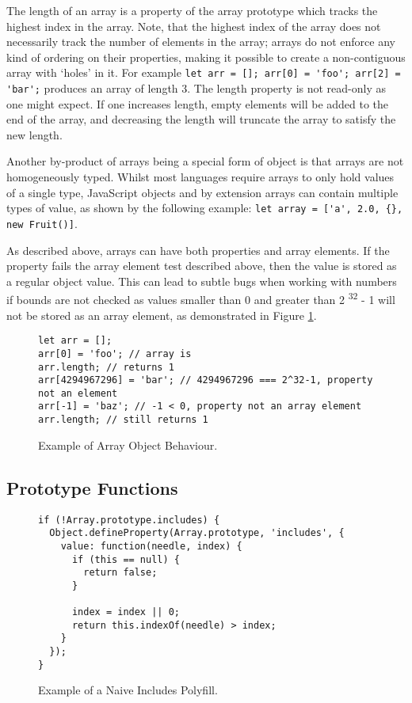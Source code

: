 \documentclass[]{final_report}
\begin{document}
The length of an array is a property of the array prototype which tracks the highest index in the array. Note, that the highest index of the array does not necessarily track the number of elements in the array; arrays do not enforce any kind of ordering on their properties, making it possible to create a non-contiguous array with `holes' in it. For example \lstinline|let arr = []; arr[0] = 'foo'; arr[2] = 'bar';| produces an array of length 3. The length property is not read-only as one might expect. If one increases length, empty elements will be added to the end of the array, and decreasing the length will truncate the array to satisfy the new length.

Another by-product of arrays being a special form of object is that arrays are not homogeneously typed. Whilst most languages require arrays to only hold values of a single type, JavaScript objects and by extension arrays can contain multiple types of value, as shown by the following example: \lstinline|let array = ['a', 2.0, {}, new Fruit()]|. 

As described above, arrays can have both properties and array elements. If the property fails the array element test described above, then the value is stored as a regular object value. This can lead to subtle bugs when working with numbers if bounds are not checked as values smaller than 0 and greater than 2  \textsuperscript{32} - 1 will not be stored as an array element, as demonstrated in Figure \ref{fig:js-array-max-length}.

\begin{figure}[t]
\begin{lstlisting}
let arr = [];
arr[0] = 'foo'; // array is 
arr.length; // returns 1
arr[4294967296] = 'bar'; // 4294967296 === 2^32-1, property not an element
arr[-1] = 'baz'; // -1 < 0, property not an array element
arr.length; // still returns 1
\end{lstlisting}
\caption{\label{fig:js-array-max-length} Example of Array Object Behaviour.}
\end{figure}

\subsection{Prototype Functions} \label{sec:array-prototype-functions}

\begin{figure}[t]
\begin{lstlisting}
if (!Array.prototype.includes) {
  Object.defineProperty(Array.prototype, 'includes', {
    value: function(needle, index) {
      if (this == null) {
        return false;
      }

      index = index || 0;
      return this.indexOf(needle) > index;
    }
  });
}
\end{lstlisting}
\caption{\label{fig:naive-includes-polyfill} Example of a Naive Includes Polyfill.}
\end{figure}
\end{document}
